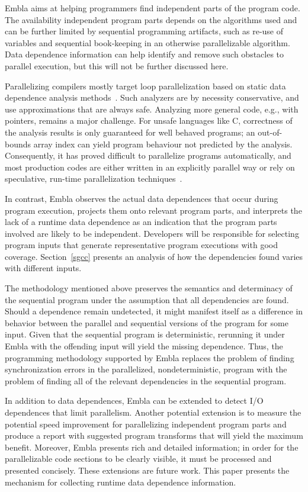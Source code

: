 \documentclass[times, 10pt,twocolumn]{article}
\begin{document}
Embla aims at helping programmers find independent parts of the 
program code.  The availability independent program parts depends on
the algorithms used and can be further
limited by sequential programming artifacts, such as re-use of
variables and sequential book-keeping in an otherwise parallelizable
algorithm.  Data dependence information can help
identify and remove such obstacles to parallel execution, but this
will not be further discussed here.

Parallelizing compilers mostly target loop parallelization based on
static data dependence analysis methods~\cite{KA02}.  Such analyzers
are by necessity conservative, and use approximations that are always
safe.  Analyzing more general code, e.g., with pointers, remains a
major challenge. For unsafe languages like C, correctness of the
analysis results is only guaranteed for well behaved programs; an
out-of-bounds array index can yield program behaviour not predicted by
the analysis. Consequently, it has proved difficult to parallelize
programs automatically, and most production codes are either written
in an explicitly parallel way or rely on speculative, run-time
parallelization techniques~\cite{PO03,CL03}.

In contrast, Embla
observes the actual data dependences that occur during program
execution, projects them onto relevant program parts, and interprets the
lack of a runtime data dependence as an indication that the program
parts involved are likely to be independent.
Developers will be responsible for selecting
program inputs that generate representative program executions with
good coverage. Section~\ref{sgcc} presents an analysis of how the
dependencies found varies with different inputs.

The methodology mentioned above preserves the
semantics and determinacy of the sequential program under the
assumption that all dependencies are found.  Should a dependence
remain undetected, it might manifest itself as a difference in
behavior between the parallel and sequential versions of the program
for some input. Given that the sequential program is deterministic,
rerunning it under Embla with the offending input will yield the
missing dependence.  Thus, the programming methodology supported by
Embla replaces the problem of finding synchronization errors in the
parallelized, nondeterministic, program with the problem of finding
all of the relevant dependencies in the sequential program.


In addition to data dependences, Embla can be extended to
detect I/O dependences that limit parallelism.  Another potential
extension is to measure the potential speed
improvement for parallelizing independent program parts and produce a
report with suggested program transforms that will yield the maximum
benefit.  Moreover, Embla presents rich and detailed information; in order
for the parallelizable code sections to be clearly visible, it must be
processed and presented concisely.  These extensions are future work.
This paper
presents the mechanism for collecting runtime data dependence information.
\end{document}
